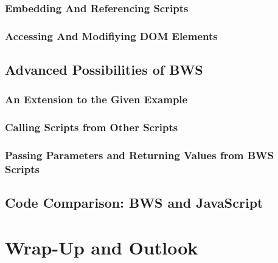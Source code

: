    

  \subsection{Embedding And Referencing Scripts}

 

  \subsection{Accessing And Modifiying DOM Elements}


 \section{Advanced Possibilities of BWS}
  \subsection{An Extension to the Given Example}
  \subsection{Calling Scripts from Other Scripts}
  \subsection{Passing Parameters and Returning Values from BWS Scripts}
 \section{Code Comparison: BWS and JavaScript}
\chapter{Wrap-Up and Outlook}

 